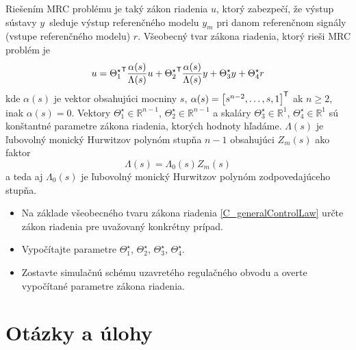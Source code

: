\documentclass[a4paper, 10pt, ]{article}
\begin{document}
\begin{enumerate}
    Riešením MRC problému je taký zákon riadenia $u$, ktorý zabezpečí, že výstup sústavy $y$~sleduje výstup referenčného modelu $y_m$ pri danom referenčnom signály (vstupe referenčného modelu) $r$. Všeobecný tvar zákona riadenia, ktorý rieši MRC problém je
    \begin{equation} \label{C_generalControlLaw}
    	u = {\Theta_1^\star}^{\mathsf{T}} \frac{\alpha(s)}{\Lambda(s)} u + {\Theta_2^\star}^{\mathsf{T}} \frac{\alpha(s)}{\Lambda(s)} y + \Theta_3^\star y + \Theta_4^\star r
    \end{equation}
    kde $\alpha(s)$ je vektor obsahujúci mocniny $s$, $\alpha(s) = \begin{bmatrix} s^{n-2}, \ldots,s, 1 \end{bmatrix}^{\mathsf{T}}$ ak $n\geq 2$, inak $\alpha(s) = 0$. Vektory $\Theta_1^\star \in \mathbb{R}^{n-1}$, $\Theta_2^\star \in \mathbb{R}^{n-1}$ a skaláry $\Theta_3^\star \in \mathbb{R}^1$, $\Theta_4^\star \in \mathbb{R}^1$ sú konštantné parametre zákona riadenia, ktorých hodnoty hľadáme.  $\Lambda(s)$ je ľubovolný monický Hurwitzov polynóm stupňa $n-1$ obsahujúci $Z_m(s)$ ako faktor
    \begin{equation}
    	\Lambda(s) = \Lambda_0(s) Z_m(s)
    \end{equation}
    a teda aj $\Lambda_0(s)$ je ľubovolný monický Hurwitzov polynóm zodpovedajúceho stupňa.


    \begin{itemize}
    	\item Na základe všeobecného tvaru zákona riadenia \eqref{C_generalControlLaw} určte zákon riadenia pre uvažovaný konkrétny prípad.
    	\item Vypočítajte parametre $\Theta_1^\star$, $\Theta_2^\star$, $\Theta_3^\star$, $\Theta_4^\star$.
    	\item Zostavte simulačnú schému uzavretého regulačného obvodu a overte vypočítané parametre zákona riadenia.
    \end{itemize}





\end{enumerate}















\section*{Otázky a úlohy}
\end{document}
